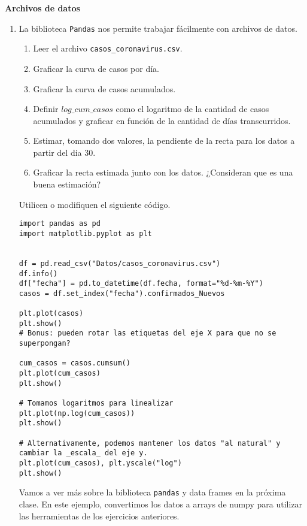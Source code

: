 \documentclass[a4paper,11pt]{article}
\theoremstyle{definition}
\begin{document}
\textbf{\large Archivos de datos}

\begin{enumerate}[resume]
\item La biblioteca \lstinline{Pandas} nos permite trabajar fácilmente con archivos de datos.

\begin{enumerate}
\item Leer el archivo \lstinline{casos_coronavirus.csv}.
\item Graficar la curva de casos por día.
\item Graficar la curva de casos acumulados.
\item Definir $log\_cum\_casos$ como el logaritmo de la cantidad de casos acumulados y graficar en función de la cantidad de días transcurridos.
\item Estimar, tomando dos valores, la pendiente de la recta para los datos a partir del dia 30.
\item Graficar la recta estimada junto con los datos. ¿Consideran que es una buena estimación?
\end{enumerate}

Utilicen o modifiquen el siguiente código.

\begin{lstlisting}
import pandas as pd
import matplotlib.pyplot as plt


df = pd.read_csv("Datos/casos_coronavirus.csv")
df.info()
df["fecha"] = pd.to_datetime(df.fecha, format="%d-%m-%Y")
casos = df.set_index("fecha").confirmados_Nuevos

plt.plot(casos)
plt.show()
# Bonus: pueden rotar las etiquetas del eje X para que no se superpongan?

cum_casos = casos.cumsum()
plt.plot(cum_casos)
plt.show()

# Tomamos logaritmos para linealizar
plt.plot(np.log(cum_casos))
plt.show()

# Alternativamente, podemos mantener los datos "al natural" y cambiar la _escala_ del eje y.
plt.plot(cum_casos), plt.yscale("log")
plt.show()
\end{lstlisting}

Vamos a ver más sobre la biblioteca \lstinline{pandas} y data frames en la próxima clase. En este ejemplo, convertimos los datos a arrays de numpy para utilizar las herramientas de los ejercicios anteriores.

\end{enumerate}
\end{document}
